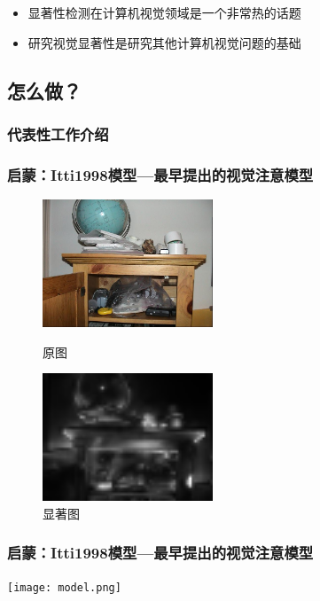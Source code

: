 \documentclass[notheorems,mathserif,table,compress]{beamer}  %
\begin{document}
\begin{frame}
  \begin{itemize}
  \item 显著性检测在计算机视觉领域是一个非常热的话题
  \item 研究视觉显著性是研究其他计算机视觉问题的基础
  \end{itemize}
\end{frame}

\subsection{怎么做？}

\subsubsection{代表性工作介绍}

\begin{frame}
  \frametitle{启蒙：Itti1998模型---最早提出的视觉注意模型}
  \begin{figure}[!ht]
  \begin{minipage}[t]{0.45\textwidth}
  \includegraphics[width=2in]{IttiIMG.jpg}
  \caption{原图}
  \end{minipage}
  \begin{minipage}[t]{0.45\textwidth}
  \includegraphics[width=2in]{IttiSM.png}
  \caption{显著图}
  \end{minipage}
  \end{figure} 
\end{frame}


\begin{frame}
  \frametitle{启蒙：Itti1998模型---最早提出的视觉注意模型}
  \centering\texttt{[image: model.png]}
\end{frame}
\end{document}
